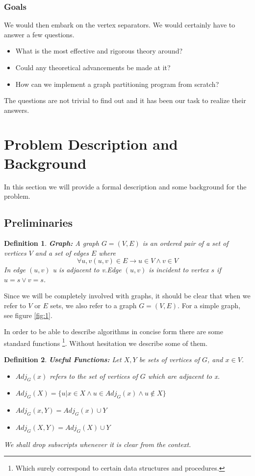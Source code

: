 \documentclass[a4paper,12pt]{article}
\begin{document}
\subsubsection{Goals}
We would then embark on the vertex separators. We would certainly have
to answer a few questions.
\begin{itemize}
\item What is the most effective and rigorous theory around?
\item Could any theoretical advancements be made at it?
\item How can we implement a graph partitioning program from scratch?
\end{itemize}

The questions are not trivial to find out and it has been our task to
realize their answers.

\section{Problem Description and Background}

In this section we will provide a formal description and some
background for the problem.

\subsection{Preliminaries}

\newtheorem{dfn}{Definition}
\begin{dfn}
\textbf{Graph:}
A graph $G=(V,E)$
is an ordered pair of a set of \textsl{vertices} $V$ and
a set of \textsl{edges} $E$ where
\begin{equation}
\forall u,v {(u,v) \in E} \rightarrow {u \in V \wedge v \in V}
\end{equation}
In edge $(u,v)$ u is adjacent to v.Edge $(u,v)$ is incident to vertex $s$ if $u=s \vee v=s$.
\end{dfn}


Since we will be completely involved with graphs, it should be clear that when we refer
to $V$ or $E$ sets, we also refer to a graph $G=(V,E)$. For a simple graph, see figure \ref{fig:1}.

In order to be able to describe algorithms in concise form there are
some standard functions \footnote{Which surely correspond to certain
data structures and procedures.}. Without hesitation we describe some
of them.

\begin{dfn}
\textbf{Useful Functions:}
Let $X,Y$ be sets of vertices of $G$, and $x \in V$.
\begin{itemize}
\item $Adj_G(x)$ refers to the set of vertices of $G$ which are adjacent to x.
\item $Adj_G(X) = \{ u | x \in X \wedge u \in Adj_G(x) \wedge u \notin X\}$
\item $Adj_G(x, Y) = Adj_G(x) \cup Y$
\item $Adj_G(X, Y) = Adj_G(X) \cup Y$
\end{itemize}
We shall drop subscripts whenever it is clear from the context.
\end{dfn}
\end{document}
